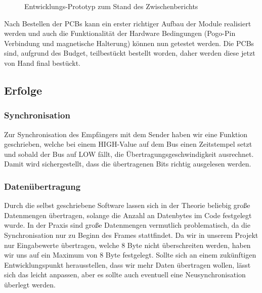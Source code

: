 \begin{figure}[H]
    \centering    
    \caption{Entwicklungs-Prototyp zum Stand des Zwischenberichts}
    \label{prototyp}
\end{figure}

Nach Bestellen der PCBs kann ein erster richtiger Aufbau der Module realisiert werden und auch die Funktionalität der Hardware Bedingungen (Pogo-Pin Verbindung und magnetische Halterung) können nun getestet werden. Die PCBs sind, aufgrund des Budget, teilbestückt bestellt worden, daher werden diese jetzt von Hand final bestückt.

\subsection{Erfolge}
\subsubsection{Synchronisation}
Zur Synchronisation des Empfängers mit dem Sender haben wir eine Funktion geschrieben, welche bei einem HIGH-Value auf dem Bus einen Zeitstempel setzt und sobald der Bus auf LOW fällt, die Übertragungsgeschwindigkeit ausrechnet. Damit wird sichergestellt, dass die übertragenen Bits richtig ausgelesen werden.

\subsubsection{Datenübertragung}
Durch die selbst geschriebene Software lassen sich in der Theorie beliebig große Datenmengen übertragen, solange die Anzahl an Datenbytes im Code festgelegt wurde. In der Praxis sind große Datenmengen vermutlich problematisch, da die Synchronisation nur zu Beginn des Frames stattfindet. Da wir in unserem Projekt nur Eingabewerte übertragen, welche 8 Byte nicht überschreiten werden, haben wir uns auf ein Maximum von 8 Byte festgelegt. Sollte sich an einem zukünftigen Entwicklungspunkt herausstellen, dass wir mehr Daten übertragen wollen, lässt sich das leicht anpassen, aber es sollte auch eventuell eine Neusynchronisation überlegt werden. 

